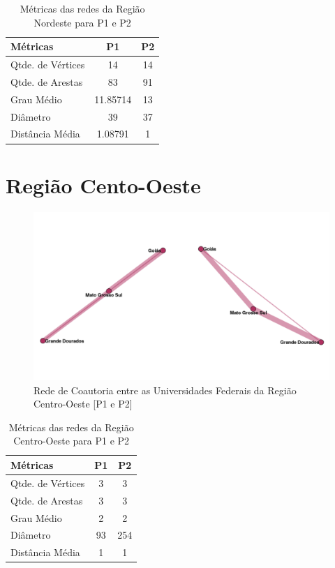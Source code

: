 \documentclass[12pt]{article}
\begin{document}


\begin{table}[H]
\centering
\begin{tabular}{lS[table-format=3.5]S[table-format=3.5]}
\hline
{} 
\textbf{Métricas} & \textbf{P1} & \textbf{P2} \\ \hline
Qtde. de Vértices & 14     & 14           \\ \hline
Qtde. de Arestas  & 83     & 91          \\ \hline
Grau Médio        & 11.85714     & 13     \\ \hline
Diâmetro          & 39     & 37           \\ \hline
Distância Média   & 1.08791      & 1     \\ \hline
\end{tabular}
\caption{Métricas das redes da Região Nordeste para P1 e P2}
\end{table}


\section{Região Cento-Oeste}


\begin{figure}[H]
\centering
\includegraphics[scale=0.6]{images/centro_oeste.pdf}
\caption{Rede de Coautoria entre as Universidades Federais da Região Centro-Oeste [P1 e P2]}
\label{rede-centro}
\end{figure}


\begin{table}[H]
\centering
\begin{tabular}{lS[table-format=3.5]S[table-format=3.5]}
\hline
{} 
\textbf{Métricas} & \textbf{P1} & \textbf{P2} \\ \hline
Qtde. de Vértices & 3           & 3           \\ \hline
Qtde. de Arestas  & 3           & 3          \\ \hline
Grau Médio        & 2           & 2          \\ \hline
Diâmetro          & 93          & 254         \\ \hline
Distância Média   & 1           & 1            \\ \hline
\end{tabular}
\caption{Métricas das redes da Região Centro-Oeste para P1 e P2}
\end{table}
\end{document}
